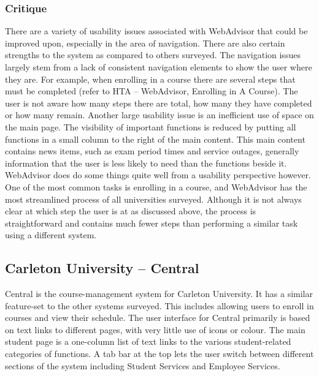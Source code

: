 \documentclass[10pt]{article}
\newenvironment{InlineColumnFigure}
{\par\medskip\noindent\minipage{\linewidth}}
{\endminipage\par\medskip}
\newcommand{\Caption}[1]
{\vspace{-4mm}\fontsize{9}{9}\textbf{Figure \refstepcounter{figCounter} 
\arabic{figCounter}: #1}}
\newcounter{figCounter}
\begin{document}
\begin{multicols}{2}
\subsubsection*{Critique}
There are a variety of usability issues associated with \mbox{WebAdvisor} that 
could be improved upon, especially in the area of navigation. There are also 
certain strengths to the system as compared to others surveyed. The navigation 
issues largely stem from a lack of consistent navigation elements to show the 
user where they are. For example, when enrolling in a course there are several 
steps that must be completed (refer to HTA -- WebAdvisor, Enrolling in A 
Course). The user is not aware how many steps there are total, how many they 
have completed or how many remain. Another large usability issue is an 
inefficient use of space on the main page. The visibility of important functions 
is reduced by putting all functions in a small column to the right of the main 
content. This main content contains news items, such as exam period times and 
service outages, generally information that the user is less likely to need than 
the functions beside it.\\

WebAdvisor does do some things quite well from a usability perspective however. 
One of the most common tasks is enrolling in a course, and WebAdvisor has the 
most streamlined process of all universities surveyed. Although it is not always 
clear at which step the user is at as discussed above, the process is 
straightforward and contains much fewer steps than performing a similar task 
using a different system.

\subsection*{Carleton University -- Central}
Central is the course-management system for Carleton University. It has a 
similar feature-set to the other systems surveyed. This includes allowing users 
to enroll in courses and view their schedule. The user interface for Central 
primarily is based on text links to different pages, with very little use of 
icons or colour. The main student page is a one-column list of text links to the 
various student-related categories of functions. A tab bar at the top lets the 
user switch between different sections of the system including Student Services 
and Employee Services.



\end{multicols}
\end{document}
